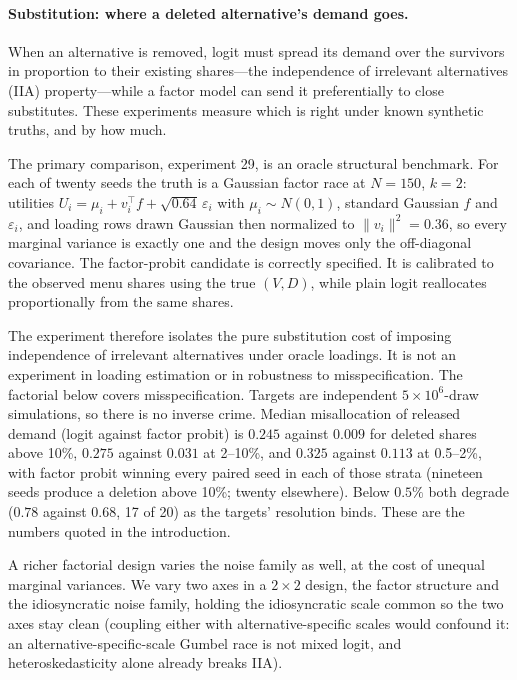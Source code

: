 \documentclass[12pt]{article}
\theoremstyle{remark}
\begin{document}
\paragraph{Substitution: where a deleted alternative's demand goes.}
When an alternative is removed, logit must spread its demand over the
survivors in proportion to their existing shares---the independence of
irrelevant alternatives (IIA) property---while
a factor model can send it preferentially to close substitutes. These
experiments measure which is right under known synthetic truths, and by
how much.

The primary comparison, experiment 29, is an oracle structural
benchmark. For each of twenty seeds the truth is a Gaussian factor race
at $N = 150$, $k = 2$: utilities $U_i = \mu_i + v_i^\top f +
\sqrt{0.64}\,\varepsilon_i$ with $\mu_i \sim N(0,1)$, standard
Gaussian $f$ and $\varepsilon_i$, and loading rows drawn Gaussian then
normalized to $\|v_i\|^2 = 0.36$, so every marginal variance is
exactly one and the design moves only the off-diagonal covariance. The
factor-probit candidate is correctly specified. It is calibrated to the
observed menu shares using the true $(V, D)$, while plain logit
reallocates proportionally from the same shares.

The experiment
therefore isolates the pure substitution cost of imposing independence
of irrelevant alternatives under oracle loadings. It is not an
experiment in loading estimation or in robustness to misspecification.
The factorial below covers misspecification. Targets are independent
$5\times10^6$-draw simulations, so there is no inverse crime. Median misallocation of
released demand (logit against factor probit) is $0.245$ against
$0.009$ for deleted shares above 10\%, $0.275$ against $0.031$
at 2--10\%, and $0.325$ against $0.113$ at 0.5--2\%, with factor
probit winning every paired seed in each of those strata (nineteen
seeds produce a deletion above 10\%; twenty elsewhere). Below
$0.5\%$ both degrade ($0.78$ against $0.68$, 17 of 20) as the targets'
resolution binds. These are the numbers quoted in the introduction.

A richer factorial design varies the noise family as well, at the cost
of unequal marginal variances. We vary two axes in a
$2\times2$ design, the factor structure and the idiosyncratic noise
family, holding the idiosyncratic scale common so the two axes stay
clean (coupling either with alternative-specific scales would confound
it: an alternative-specific-scale Gumbel race is not mixed logit, and
heteroskedasticity alone already breaks IIA).
\end{document}
